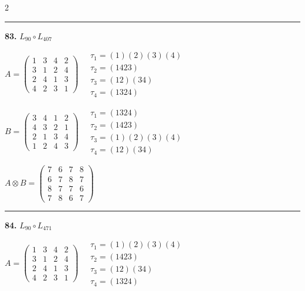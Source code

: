 \begin{multicols}{2}
\vspace{0.3em}
\hrule
\vspace{0.3em}

\noindent\textbf{83.} $L_{90} \circ L_{407}$

$A = \begin{pmatrix} 1 & 3 & 4 & 2 \\ 3 & 1 & 2 & 4 \\ 2 & 4 & 1 & 3 \\ 4 & 2 & 3 & 1 \end{pmatrix} \quad \begin{matrix} \tau_{1}=(1)(2)(3)(4) \\ \tau_{2}=(1 4 2 3) \\ \tau_{3}=(1 2)(3 4) \\ \tau_{4}=(1 3 2 4) \end{matrix}$

$B = \begin{pmatrix} 3 & 4 & 1 & 2 \\ 4 & 3 & 2 & 1 \\ 2 & 1 & 3 & 4 \\ 1 & 2 & 4 & 3 \end{pmatrix} \quad \begin{matrix} \tau_{1}=(1 3 2 4) \\ \tau_{2}=(1 4 2 3) \\ \tau_{3}=(1)(2)(3)(4) \\ \tau_{4}=(1 2)(3 4) \end{matrix}$

$A \otimes B = \begin{pmatrix} 7 & 6 & 7 & 8 \\ 6 & 7 & 8 & 7 \\ 8 & 7 & 7 & 6 \\ 7 & 8 & 6 & 7 \end{pmatrix}$

\vspace{0.3em}
\hrule
\vspace{0.3em}

\noindent\textbf{84.} $L_{90} \circ L_{471}$

$A = \begin{pmatrix} 1 & 3 & 4 & 2 \\ 3 & 1 & 2 & 4 \\ 2 & 4 & 1 & 3 \\ 4 & 2 & 3 & 1 \end{pmatrix} \quad \begin{matrix} \tau_{1}=(1)(2)(3)(4) \\ \tau_{2}=(1 4 2 3) \\ \tau_{3}=(1 2)(3 4) \\ \tau_{4}=(1 3 2 4) \end{matrix}$


\end{multicols}
